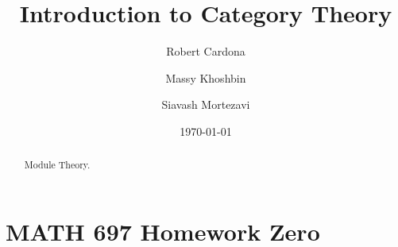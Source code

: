 \documentclass[8pt]{amsart}
\theoremstyle{plain}%
\theoremstyle{definition}
\theoremstyle{remark}
\numberwithin{equation}{section}
\begin{document}
\title[MATH 697]{Introduction to Category Theory}


\author{
	Robert Cardona %
	\and
	Massy Khoshbin %
	\and
	Siavash Mortezavi %
}


\address{Department of Mathematics \\ California State University Long Beach}

\date{\today}

\begin{abstract}
Module Theory.
\end{abstract}

\maketitle

\setcounter{section}{-1}
\section{MATH 697 Homework Zero}
\end{document}
